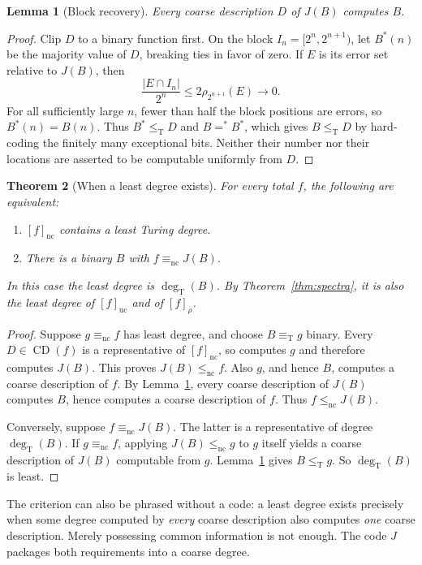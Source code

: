 \documentclass[11pt,a4paper]{article}
\newcommand{\leT}{\leq_{\mathrm T}}
\newcommand{\eqT}{\equiv_{\mathrm T}}
\newcommand{\degT}{\operatorname{deg}_{\mathrm T}}
\newcommand{\CD}{\operatorname{CD}}
\newcommand{\nc}{\mathrm{nc}}
\newcommand{\uc}{\mathrm{uc}}
\newtheorem{theorem}{Theorem}[section]
\newtheorem{lemma}[theorem]{Lemma}
\theoremstyle{definition}\newtheorem{definition}[theorem]{Definition}
\theoremstyle{remark}\newtheorem{remark}[theorem]{Remark}
\begin{document}
\begin{lemma}[Block recovery]\label{lem:block}
Every coarse description $D$ of $J(B)$ computes $B$.
\end{lemma}
\begin{proof}
Clip $D$ to a binary function first. On the block
$I_n=[2^n,2^{n+1})$, let $B^*(n)$ be the majority value of $D$, breaking ties
in favor of zero. If $E$ is its error set relative to $J(B)$, then
\[
 \frac{|E\cap I_n|}{2^n}
 \le 2\rho_{2^{n+1}}(E)\longrightarrow0.
\]
For all sufficiently large $n$, fewer than half the block positions are
errors, so $B^*(n)=B(n)$. Thus $B^*\leT D$ and $B=^*B^*$, which gives
$B\leT D$ by hard-coding the finitely many exceptional bits. Neither their
number nor their locations are asserted to be computable uniformly from $D$.
\end{proof}

\begin{theorem}[When a least degree exists]\label{thm:least-characterization}
For every total $f$, the following are equivalent:
\begin{enumerate}[label=\textup{(\roman*)}]
\item $[f]_{\nc}$ contains a least Turing degree.
\item There is a binary $B$ with $f\equiv_{\nc}J(B)$.
\end{enumerate}
In this case the least degree is $\degT(B)$. By Theorem~\ref{thm:spectra}, it is
also the least degree of $[f]_{\uc}$ and of $[f]_{\rho}$.
\end{theorem}
\begin{proof}
Suppose $g\equiv_{\nc}f$ has least degree, and choose $B\eqT g$ binary.
Every $D\in\CD(f)$ is a representative of $[f]_{\nc}$, so computes $g$ and
therefore computes $J(B)$. This proves $J(B)\leq_{\nc}f$.
Also $g$, and hence $B$, computes a coarse description of $f$. By
Lemma~\ref{lem:block}, every coarse description of $J(B)$ computes $B$, hence
computes a coarse description of $f$. Thus $f\leq_{\nc}J(B)$.

Conversely, suppose $f\equiv_{\nc}J(B)$. The latter is a representative of
degree $\degT(B)$. If $g\equiv_{\nc}f$, applying $J(B)\leq_{\nc}g$ to $g$
itself yields a coarse description of $J(B)$ computable from $g$.
Lemma~\ref{lem:block} gives $B\leT g$. So $\degT(B)$ is least.
\end{proof}

The criterion can also be phrased without a code: a least degree exists
precisely when some degree computed by \emph{every} coarse description also
computes \emph{one} coarse description. Merely possessing common information
is not enough. The code $J$ packages both requirements into a coarse degree.
\end{document}
